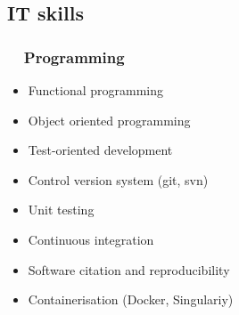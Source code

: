 \documentclass[10pt,a4paper,svgnames]{article}
\newcommand*\circled[1]{\tikz[baseline=(char.base)]{\node[shape=circle,draw,inner sep=2pt] (char) {#1};}}
\begin{document}
\subsection{IT skills}

\subsubsection*{\circled{\faCode}~~Programming}
\begin{itemize}
\item Functional programming 				
\item Object oriented programming		
\item Test-oriented development			
\item Control version system (git, svn)
\item Unit testing							
\item Continuous integration
\item Software citation and reproducibility
\item Containerisation (Docker, Singulariy)
\end{itemize}
\end{document}
